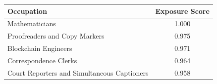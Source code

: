 \begin{tabular}{lc}
\hline
Occupation & Exposure Score \\
\hline
Mathematicians&1.000\\
Proofreaders and Copy Markers&0.975\\
Blockchain Engineers&0.971\\
Correspondence Clerks&0.964\\
Court Reporters and Simultaneous Captioners&0.958\\
\hline
\end{tabular}
